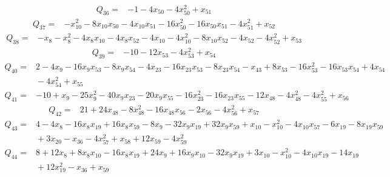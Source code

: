 \documentclass[11pt]{article}
\theoremstyle{definition}\newtheorem{definition}[theorem]{Definition}
\begin{document}
{\begin{align*}
\end{align*}
\begin{align*}
 Q_{36}={}&-1 -4x_{50} -4x_{50}^{2} +x_{51}
\end{align*}
\begin{align*}
 Q_{37}={}&-x_{10}^{2} -8x_{10}x_{50} -4x_{10}x_{51} -16x_{50}^{2} -16x_{50}x_{51} -4x_{51}^{2} +x_{52}
\end{align*}
\begin{align*}
 Q_{38}={}&-x_{8} -x_{8}^{2} -4x_{8}x_{10} -4x_{8}x_{52} -4x_{10} -4x_{10}^{2} -8x_{10}x_{52} -4x_{52} -4x_{52}^{2} +x_{53}
\end{align*}
\begin{align*}
 Q_{39}={}&-10 -12x_{53} -4x_{53}^{2} +x_{54}
\end{align*}
\begin{align*}
 Q_{40}={}&2 -4x_{9} -16x_{9}x_{53} -8x_{9}x_{54} -4x_{23} -16x_{23}x_{53} -8x_{23}x_{54} -x_{43} +8x_{53} -16x_{53}^{2} -16x_{53}x_{54} +4x_{54}\\
 &{}-4x_{54}^{2} +x_{55}
\end{align*}
\begin{align*}
 Q_{41}={}&-10 +x_{9} -25x_{9}^{2} -40x_{9}x_{23} -20x_{9}x_{55} -16x_{23}^{2} -16x_{23}x_{55} -12x_{48} -4x_{48}^{2} -4x_{55}^{2} +x_{56}
\end{align*}
\begin{align*}
 Q_{42}={}&21 +24x_{48} -8x_{48}^{2} -16x_{48}x_{56} -2x_{56} -4x_{56}^{2} +x_{57}
\end{align*}
\begin{align*}
 Q_{43}={}&4 -4x_{8} -16x_{8}x_{19} +16x_{8}x_{59} -8x_{9} -32x_{9}x_{19} +32x_{9}x_{59} +x_{10} -x_{10}^{2} -4x_{10}x_{57} -6x_{19} -8x_{19}x_{59}\\
 &{}+3x_{20} -x_{36} -4x_{57}^{2} +x_{58} +12x_{59} -4x_{59}^{2}
\end{align*}
\begin{align*}
 Q_{44}={}&8 +12x_{8} +8x_{8}x_{10} -16x_{8}x_{19} +24x_{9} +16x_{9}x_{10} -32x_{9}x_{19} +3x_{10} -x_{10}^{2} -4x_{10}x_{19} -14x_{19}\\
 &{}+12x_{19}^{2} -x_{36} +x_{59}
\end{align*}
}
\end{document}

